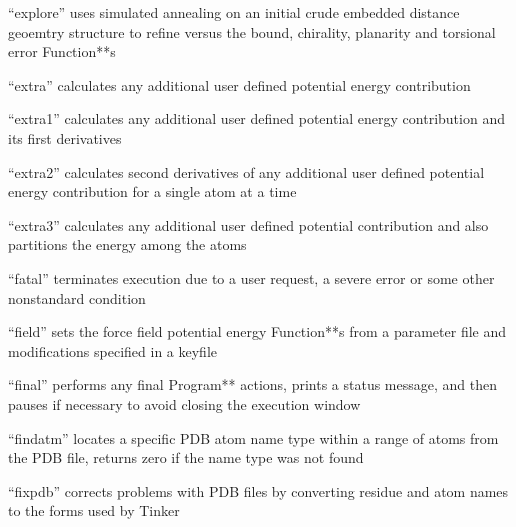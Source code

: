 \documentclass[letterpaper,11pt,english]{sphinxmanual}
\begin{document}

“explore” uses simulated annealing on an initial crude embedded distance geoemtry structure to refine versus the bound, chirality, planarity and torsional error Function**s


“extra” calculates any additional user defined potential energy contribution


“extra1” calculates any additional user defined potential energy contribution and its first derivatives


“extra2” calculates second derivatives of any additional user defined potential energy contribution for a single atom at a time


“extra3” calculates any additional user defined potential contribution and also partitions the energy among the atoms


“fatal” terminates execution due to a user request, a severe error or some other nonstandard condition





“field” sets the force field potential energy Function**s from a parameter file and modifications specified in a keyfile


“final” performs any final Program** actions, prints a status message, and then pauses if necessary to avoid closing the execution window


“findatm” locates a specific PDB atom name type within a range of atoms from the PDB file, returns zero if the name type was not found


“fixpdb” corrects problems with PDB files by converting residue and atom names to the forms used by Tinker
\end{document}
